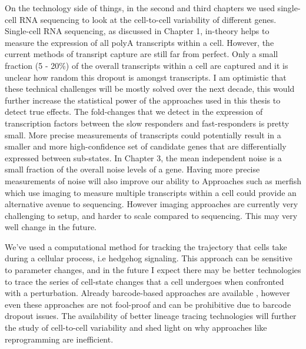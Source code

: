 On the technology side of things, in the second and third chapters we  used single-cell RNA sequencing to look at the cell-to-cell variability of different genes. Single-cell RNA sequencing, as discussed in Chapter 1, in-theory helps to measure the expression of all polyA transcripts within a cell. However, the current methods of transript capture are still far from perfect. Only a small fraction (5 - 20\%) of the overall transcripts within a cell are captured \cite{battich_control_2015} and it is unclear how random this dropout is amongst transcripts. I am optimistic that these technical challenges will be mostly solved over the next decade, this would further increase the statistical power of the approaches used in this thesis to detect true effects. The fold-changes that we detect in the expression of transcription factors between the slow responders and fast-responders is pretty small. More precise measurements of transcripts could potentially result in a smaller and more high-confidence set of candidate genes that are differentially expressed between sub-states. In Chapter 3, the mean independent noise is a small fraction of the overall noise levels of a gene. Having more precise measurements of noise will also improve our ability to Approaches such as merfish \cite{xia2019pnasu} which use imaging to measure multiple transcripts within a cell could provide an alternative avenue to sequencing. However imaging approaches are currently very challenging to setup, and harder to scale compared to sequencing. This may very well change in the future.

We've used a computational method for tracking the trajectory that cells take during a cellular process, i.e hedgehog signaling. This approach can be sensitive to parameter changes, and in the future I expect there may be better technologies to trace the series of cell-state changes that a cell undergoes when confronted with a perturbation. Already barcode-based approaches are available \cite{Biddy2018-ct} \cite{moudgil2020c}, however even these approaches are not fool-proof and can be prohibitive due to barcode dropout issues. The availability of better lineage tracing technologies will further the study of cell-to-cell variability and shed light on why approaches like reprogramming are inefficient.

